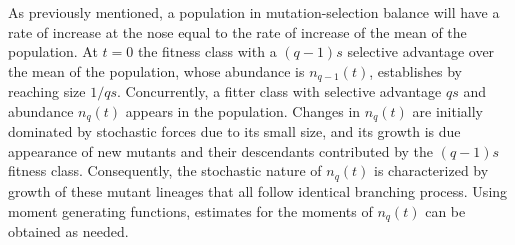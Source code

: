 \documentclass[12pt]{article}
\begin{document}
As previously mentioned, a population in mutation-selection balance will have a rate of increase at the nose equal to the rate of increase of the mean of the population.  At $t=0$ the fitness class with a $(q-1)s$ selective advantage over the mean of the population, whose abundance is $n_{q-1}(t)$, establishes by reaching size $1/qs$.  Concurrently, a fitter class with selective advantage $qs$ and abundance $n_q(t)$ appears in the population.  Changes in $n_q(t)$ are initially dominated by stochastic forces due to its small size, and its growth is due appearance of new mutants and their descendants contributed by the $(q-1)s$ fitness class. Consequently, the stochastic nature of $n_q(t)$ is characterized by growth of these mutant lineages that all follow identical branching process.  Using moment generating functions, estimates for the moments of $n_q(t)$ can be obtained as needed.
\end{document}
